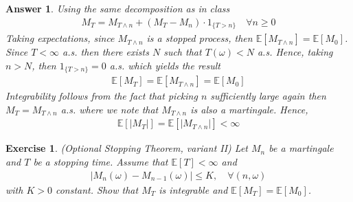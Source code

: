 \documentclass[12pt]{article}
\theoremstyle{colon}
\newtheorem{exercise}{Exercise}
\newtheorem*{answer}{Answer}
\begin{document}
\begin{answer}
  Using the same decomposition as in class
  \begin{gather*}
    M_T = M_{T \land n} + (M_T - M_n) \cdot 1_{ \{ T > n \} } \quad \forall n \geq 0
  \end{gather*}
  Taking expectations, since $M_{T \land n}$ is a stopped process, then $\mathbb{E}[ M_{T \land n} ] = \mathbb{E}[M_0]$. Since $T < \infty$ a.s. then there exists $N$ such that $T(\omega) < N$ a.s. Hence, taking $n > N$, then $1_{ \{ T > n \} } = 0$ a.s. which yields the result
  \begin{gather*}
    \mathbb{E}[M_T] = \mathbb{E}[M_{T \land n}] = \mathbb{E}[M_0]
  \end{gather*}
  Integrability follows from the fact that picking $n$ sufficiently large again then $M_T = M_{T \land n}$ a.s. where we note that $M_{T \land n}$ is also a martingale. Hence,
  \begin{gather*}
    \mathbb{E}[ \lvert M_T \rvert ] = \mathbb{E}[ \lvert M_{T \land n} \rvert ] < \infty
  \end{gather*}
\end{answer}

\clearpage

\begin{exercise}
  (Optional Stopping Theorem, variant II) Let $M_n$ be a martingale and $T$ be a stopping time. Assume that $\mathbb{E}[T] < \infty$ and
  \begin{gather*}
    \lvert M_n(\omega) - M_{n-1}(\omega) \rvert \leq K, \quad \forall (n ,\omega)
  \end{gather*}
  with $K > 0$ constant. Show that $M_T$ is integrable and $\mathbb{E}[M_T] = \mathbb{E}[M_0]$.
\end{exercise}
\end{document}
